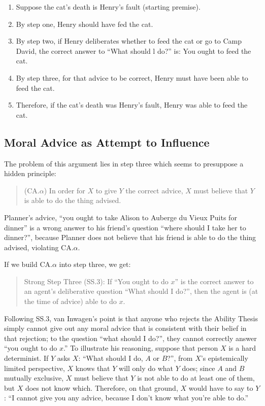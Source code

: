 \begin{enumerate}
\def\labelenumi{\arabic{enumi}.}
\setcounter{enumi}{0}
\item
Suppose the cat's death is Henry's fault (starting premise).

\item 
By step one, Henry should have fed the cat.

\item 
By step two, if Henry deliberates whether to feed the cat or go to
Camp David, the correct answer to ``What should l do?'' is: You ought to
feed the cat.

\item 
By step three, for that advice to be correct, Henry must have been
able to feed the cat.

\item 
Therefore, if the cat's death was Henry's fault, Henry was able to
feed the cat.
\end{enumerate}

\subsection{Moral Advice as Attempt to Influence}

The problem of this argument lies in step three which seems to
presuppose a hidden principle:

\vspace{-1em}
\begin{quote}
(CA.$\alpha$) In order for $X$ to give $Y$ the correct advice, $X$ must believe that
$Y$ is able to do the thing advised.
\end{quote}

\noindent Planner's advice, ``you ought to take Alison to Auberge du Vieux Puits
for dinner'' is a wrong answer to his friend's question ``where should I
take her to dinner?'', because Planner does not believe that his friend
is able to do the thing advised, violating CA.$\alpha$.

If we build CA.$\alpha$ into step three, we get:

\vspace{-1em}
\begin{quote}
Strong Step Three (SS.3): If ``You ought to do $x$'' is the correct answer
to an agent's deliberative question ``What should I do?'', then the
agent is (at the time of advice) able to do $x$.
\end{quote}

\noindent Following SS.3, van Inwagen's point is that anyone who rejects the
Ability Thesis simply cannot give out any moral advice that is
consistent with their belief in that rejection; to the question ``what
should I do?'', they cannot correctly answer ``you ought to do $x$.'' To
illustrate his reasoning, suppose that person $X$ is a hard determinist.
If $Y$ asks $X$: ``What should I do, $A$ or $B$?'', from $X$'s epistemically
limited perspective, $X$ knows that $Y$ will only do what $Y$ does; since $A$
and $B$ mutually exclusive, $X$ must believe that $Y$ is not able to do at
least one of them, but $X$ does not know which. Therefore, on that ground,
$X$ would have to say to $Y$: ``I cannot give you any advice, because I
don't know what you're able to do.''

